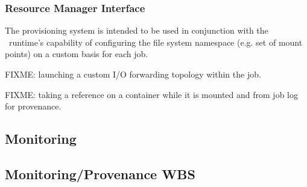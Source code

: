 \subsubsection{Resource Manager Interface}

The provisioning system is intended to be used in conjunction with
the \ngrm\ runtime's capability of configuring the file system
namespace (e.g. set of mount points) on a custom basis for each job. 

FIXME: launching a custom I/O forwarding topology within the job.

FIXME: taking a reference on a container while it is mounted and
from job log for provenance.

\subsection{Monitoring}

\newpage
\subsection{Monitoring/Provenance WBS}


